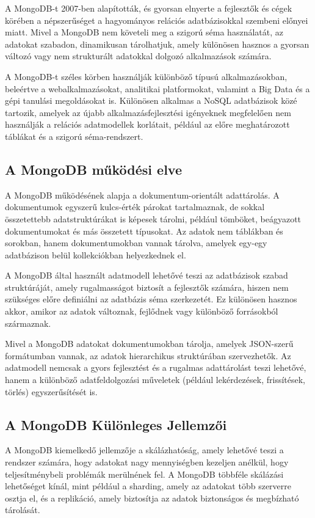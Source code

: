 \documentclass[
]{thesis-ekf}
\theoremstyle{definition}
\theoremstyle{remark}
\begin{document}
A MongoDB-t 2007-ben alapították, és gyorsan elnyerte a fejlesztők és cégek körében a népszerűséget a hagyományos relációs adatbázisokkal szembeni előnyei miatt. Mivel a MongoDB nem követeli meg a szigorú séma használatát, az adatokat szabadon, dinamikusan tárolhatjuk, amely különösen hasznos a gyorsan változó vagy nem strukturált adatokkal dolgozó alkalmazások számára.

A MongoDB-t széles körben használják különböző típusú alkalmazásokban, beleértve a webalkalmazásokat, analitikai platformokat, valamint a Big Data és a gépi tanulási megoldásokat is. Különösen alkalmas a NoSQL adatbázisok közé tartozik, amelyek az újabb alkalmazásfejlesztési igényeknek megfelelően nem használják a relációs adatmodellek korlátait, például az előre meghatározott táblákat és a szigorú séma-rendszert.

\subsection{A MongoDB működési elve}
A MongoDB működésének alapja a dokumentum-orientált adattárolás. A dokumentumok egyszerű kulcs-érték párokat tartalmaznak, de sokkal összetettebb adatstruktúrákat is képesek tárolni, például tömböket, beágyazott dokumentumokat és más összetett típusokat. Az adatok nem táblákban és sorokban, hanem dokumentumokban vannak tárolva, amelyek egy-egy adatbázison belül kollekciókban helyezkednek el.

A MongoDB által használt adatmodell lehetővé teszi az adatbázisok szabad struktúráját, amely rugalmasságot biztosít a fejlesztők számára, hiszen nem szükséges előre definiálni az adatbázis séma szerkezetét. Ez különösen hasznos akkor, amikor az adatok változnak, fejlődnek vagy különböző forrásokból származnak.

Mivel a MongoDB adatokat dokumentumokban tárolja, amelyek JSON-szerű formátumban vannak, az adatok hierarchikus struktúrában szervezhetők. Az adatmodell nemcsak a gyors fejlesztést és a rugalmas adattárolást teszi lehetővé, hanem a különböző adatfeldolgozási műveletek (például lekérdezések, frissítések, törlés) egyszerűsítését is.

\subsection{A MongoDB Különleges Jellemzői}
A MongoDB kiemelkedő jellemzője a skálázhatóság, amely lehetővé teszi a rendszer számára, hogy adatokat nagy mennyiségben kezeljen anélkül, hogy teljesítménybeli problémák merülnének fel. A MongoDB többféle skálázási lehetőséget kínál, mint például a sharding, amely az adatokat több szerverre osztja el, és a replikáció, amely biztosítja az adatok biztonságos és megbízható tárolását.
\end{document}
